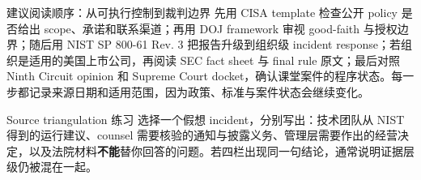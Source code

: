 \documentclass[a4paper]{article}
\begin{document}
\begin{knowledgebox}{建议阅读顺序：从可执行控制到裁判边界}
先用 CISA template 检查公开 policy 是否给出 scope、承诺和联系渠道；再用 DOJ framework 审视 good-faith 与授权边界；随后用 NIST SP 800-61 Rev. 3 把报告升级到组织级 incident response；若组织是适用的美国上市公司，再阅读 SEC fact sheet 与 final rule 原文；最后对照 Ninth Circuit opinion 和 Supreme Court docket，确认课堂案件的程序状态。每一步都记录来源日期和适用范围，因为政策、标准与案件状态会继续变化。
\end{knowledgebox}

\begin{importantbox}{Source triangulation 练习}
选择一个假想 incident，分别写出：技术团队从 NIST 得到的运行建议、counsel 需要核验的通知与披露义务、管理层需要作出的经营决定，以及法院材料\textbf{不能}替你回答的问题。若四栏出现同一句结论，通常说明证据层级仍被混在一起。
\end{importantbox}
\end{document}
